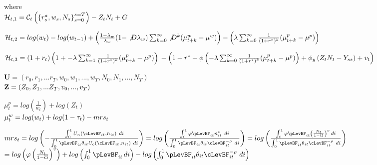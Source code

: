 \documentclass[titlepage]{\econtex}\providecommand{\texname}{BufferStockTheory}
\begin{document}
 where \\ 
 
 
 $\mathcal{H}_{t,1}  =\mathcal{C}_{t}\left( \left \{r^{a}_{s} , w_{s} , N_{s}  \right \}_{s=0}^{s=T} \right) - Z_{t} N_{t} + G\\ \\ $

$ \mathcal{H}_{t,2}  =log(w_{t}) - log(w_{t-1}) + \left( \frac{1 - \lambda_{w}}{\lambda_{w}}(1 - \not D \lambda_{w}) \sum_{k=0}^{\infty} \not D^{k} ( \mu_{t+k}^{w} - \mu^{w}) \right) - \left(  \lambda \sum_{k=0}^{\infty} \frac{1}{(1+r^{*})^{k}} ( \mu_{t+k}^{p} - \mu^{p})\right)\\ \\ $

$ \mathcal{H}_{t,3}  =  (1+r_{t}) \left(1+ -\lambda \sum_{k=1}^{\infty} \frac{1}{(1+r^{*})^{k}} ( \mu_{t+k}^{p} - \mu^{p}) \right) \\ \\
 - \left(1+r^{*}+ \phi \left(- \lambda \sum_{k=0}^{\infty} \frac{1}{(1+r^{*})^{k}} ( \mu_{t+k}^{p} - \mu^{p}) \right) +\phi_{y} \left(Z_{t} N_{t} - Y_{ss} \right) + v_{t}\right) \\ \\ $
 
$\mathbf{U} = (r_{0} , r_{1} , ...r_{T}, w_{0}, w_{1}, ..., w_{T}, N_{0}, N_{1},...,N_{T})$ \\ 

$ \mathbf{Z} = ( Z_{0}, Z_{1},... Z_{T}, v_{0},...,v_{T}) \\ \\ $ 

$ \mu_{t}^{p} = log(\frac{1}{w_{t}}) + log(Z_{t})$ \\ 

$\mu_{t}^{w} = log(w_{t}) + log(1 - \tau_{t}) - mrs_{t} \\ \\ $


$mrs_{t} = log \left(- \frac{\int_{0}^{1}   U_{n} \left(\cLevBF_{i t}, n_{i t} \right) \ d i  }{\int_{0}^{1} \pLevBF_{it} \theta_{it} U_{c} \left(\cLevBF_{i t}, n_{i t} \right) \  di } \right) = log \left(\frac{\int_{0}^{1} \varphi \pLevBF_{it} n_{it}^{v} \ d i  }{\int_{0}^{1} \pLevBF_{it}  \theta_{it} \cLevBF_{it}^{-\rho} \  di } \right) = log \left(\frac{\int_{0}^{1} \varphi \pLevBF_{it} \left(\frac{N_{t}}{1 - \mho} \right)^{v} \, d i  }{\int_{0}^{1} \pLevBF_{it}  \theta_{it} \cLevBF_{it}^{-\rho} \  di } \right)$ \\ 

$ = log \left( \varphi \left(\frac{N_{t}}{1 - \mho}\right) ^{v}\right) + log \left(\int_{0}^{1} \pLevBF_{it}  \,  di  \right) - log \left(\int_{0}^{1} \pLevBF_{it}  \theta_{it} \cLevBF_{it}^{-\rho} \  di  \right) $
\end{document}
